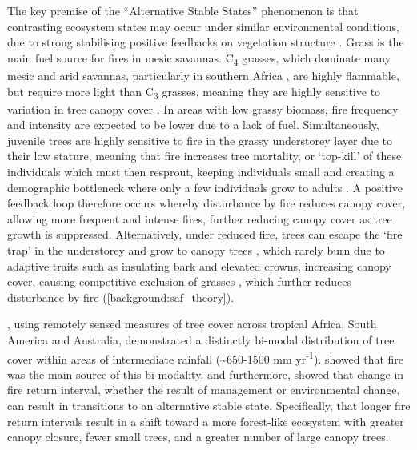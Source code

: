 \begin{refsection}
The key premise of the ``Alternative Stable States'' phenomenon is that contrasting ecosystem states may occur under similar environmental conditions, due to strong stabilising positive feedbacks on vegetation structure \citep{Staver2011}. Grass is the main fuel source for fires in mesic savannas. C\textsubscript{4} grasses, which dominate many mesic and arid savannas, particularly in southern Africa \citep{Still2003}, are highly flammable, but require more light than C\textsubscript{3} grasses, meaning they are highly sensitive to variation in tree canopy cover \citep{CharlesDominique2018}. In areas with low grassy biomass, fire frequency and intensity are expected to be lower due to a lack of fuel. Simultaneously, juvenile trees are highly sensitive to fire in the grassy understorey layer due to their low stature, meaning that fire increases tree mortality, or `top-kill' of these individuals which must then resprout, keeping individuals small and creating a demographic bottleneck where only a few individuals grow to adults \citep{Bond1995, Ryan2011}. A positive feedback loop therefore occurs whereby disturbance by fire reduces canopy cover, allowing more frequent and intense fires, further reducing canopy cover as tree growth is suppressed. Alternatively, under reduced fire, trees can escape the `fire trap' in the understorey and grow to canopy trees \citep{Wakeling2011}, which rarely burn due to adaptive traits such as insulating bark and elevated crowns, increasing canopy cover, causing competitive exclusion of grasses \citep{Moustakas2013}, which further reduces disturbance by fire (\autoref{background:saf_theory}). 

\citet{Hirota2011}, using remotely sensed measures of tree cover across tropical Africa, South America and Australia, demonstrated a distinctly bi-modal distribution of tree cover within areas of intermediate rainfall (\textasciitilde{}650-1500 mm yr\textsuperscript{-1}). \citet{Staver2011} showed that fire was the main source of this bi-modality, and furthermore, \citet{Staver2017} showed that change in fire return interval, whether the result of management or environmental change, can result in transitions to an alternative stable state. Specifically, that longer fire return intervals result in a shift toward a more forest-like ecosystem with greater canopy closure, fewer small trees, and a greater number of large canopy trees.


\end{refsection}
